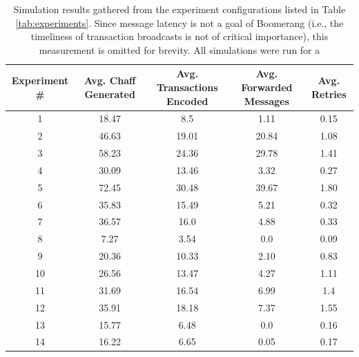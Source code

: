\begin{table}
\begin{center}
\caption{Simulation results gathered from the experiment configurations listed in Table \ref{tab:experiments}. Since message latency is not a goal of Boomerang (i.e., the timeliness of transaction broadcasts is not of critical importance), this measurement is omitted for brevity. All simulations were run for a }
\label{tab:sim-results}
    \begin{tabular}{|c|c|c|c|c|} \hline
    {\bf Experiment \#} & {\bf Avg. Chaff Generated} & {\bf Avg. Transactions Encoded} & {\bf Avg. Forwarded Messages} & {\bf Avg. Retries} \\ \hline
    1  & 18.47 & 8.5 & 1.11 & 0.15 \\
    2  & 46.63 & 19.01 & 20.84 & 1.08 \\
    3  & 58.23 & 24.36 & 29.78 & 1.41 \\
    4  & 30.09 & 13.46 & 3.32 & 0.27 \\
    5  & 72.45 & 30.48 & 39.67 & 1.80 \\
    6  & 35.83 & 15.49 & 5.21 & 0.32 \\
    7  & 36.57 & 16.0 & 4.88 & 0.33 \\
    8  & 7.27 & 3.54 & 0.0 & 0.09 \\
    9  & 20.36 & 10.33 & 2.10 & 0.83 \\
    10 & 26.56 & 13.47 & 4.27 & 1.11 \\
    11 & 31.69 & 16.54 & 6.99 & 1.4 \\
    12 & 35.91 & 18.18 & 7.37 & 1.55 \\
    13 & 15.77 & 6.48 & 0.0 & 0.16 \\
    14 & 16.22 & 6.65 & 0.05 & 0.17 \\
    \hline
    \end{tabular}
\end{center}
\end{table}

